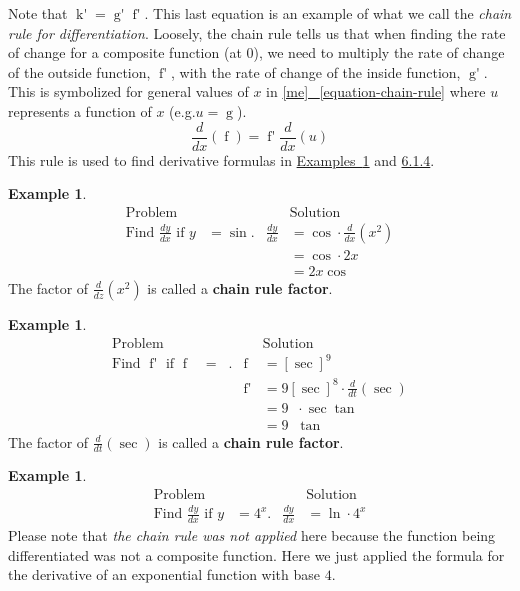 \documentclass[12pt,]{book}
\newcommand{\terminology}[1]{\textbf{#1}}
\theoremstyle{plain}
\theoremstyle{definition}
\newtheorem{example}[theorem]{Example}
\numberwithin{equation}{section}
\newcommand{\fe}[2]{\mathop{{#1}{\left(#2\right)}}}
\newcommand{\fd}[1]{#1'}
\newcommand{\lz}[2]{\frac{d#1}{d#2}}
\newcommand{\lzoo}[2]{{\frac{d}{d#1}}{\left(#2\right)}}
\begin{document}
\par
Note that \(\fe{\fd{k}}{0}=\fe{\fd{g}}{0}\fe{\fd{f}}{\fe{g}{0}}\).  This last equation is an example of what we call the \emph{chain rule for differentiation}. Loosely, the chain rule tells us that when finding the rate of change for a composite function (at \(0\)), we need to multiply the rate of change of the outside function, \(\fe{\fd{f}}{\fe{g}{0}}\), with the rate of change of the inside function, \(\fe{\fd{g}}{0}\).  This is symbolized for general values of \(x\) in \hyperref[equation-chain-rule]{[me]
~\ref*{equation-chain-rule}} where \(u\) represents a function of \(x\) (e.g.\@ \(u=\fe{g}{x}\)). \[\lzoo{x}{\fe{f}{u}}=\fe{\fd{f}}{u}\lzoo{x}{u}\]This rule is used to find derivative formulas in \hyperref[example-chain-rule]{Examples~\ref*{example-chain-rule}} and \hyperref[example-second-chain-rule]{6.1.4}.%
\begin{example}\label{example-chain-rule}
\begin{align*}
\text{Problem}&&&\text{Solution}\\
\text{Find }\lz{y}{x}\text{ if }y&=\fe{\sin}{x^2}\text{.}&\lz{y}{x}&=\fe{\cos}{x^2}\cdot\lzoo{x}{x^2}\\
&&&=\fe{\cos}{x^2}\cdot2x\\
&&&=2x\fe{\cos}{x^2}
\end{align*}The factor of \(\lzoo{z}{x^2}\) is called a \terminology{chain rule factor}.%
\end{example}
\begin{example}\label{example-second-chain-rule}
\begin{align*}
\text{Problem}&&&\text{Solution}\\
\text{Find }\fe{\fd{f}}{t}\text{ if }\fe{f}{t}&=\fe{\sec^9}{t}\text{.}&\fe{f}{t}&=\left[\fe{\sec}{t}\right]^9\\
&&\fe{\fd{f}}{t}&=9\left[\fe{\sec}{t}\right]^8\cdot\lzoo{t}{\fe{\sec}{t}}\\
&&&=9\fe{\sec^8}{t}\cdot\fe{\sec}{t}\fe{\tan}{t}\\
&&&=9\fe{\sec^9}{t}\fe{\tan}{t}
\end{align*}The factor of \(\lzoo{t}{\fe{\sec}{t}}\) is called a \terminology{chain rule factor}.%
\end{example}
\begin{example}\label{example-third-chain-rule}
\begin{align*}
\text{Problem}&&&\text{Solution}\\
\text{Find }\lz{y}{x}\text{ if }y&=4^x\text{.}&\lz{y}{x}&=\fe{\ln}{4}\cdot4^x
\end{align*}Please note that \emph{the chain rule was not applied} here because the function being differentiated was not a composite function. Here we just applied the formula for the derivative of an exponential function with base \(4\).%
\end{example}
\end{document}
